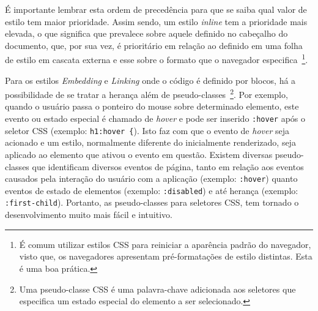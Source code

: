 É importante lembrar esta ordem de precedência para que se saiba qual valor de estilo tem maior prioridade. Assim sendo, um estilo \textit{inline} tem a prioridade mais elevada, o que significa que prevalece sobre aquele definido no cabeçalho do documento, que, por sua vez, é prioritário em relação ao definido em uma folha de estilo em cascata externa e esse sobre o formato que o navegador especifica~\footnote{É comum utilizar estilos CSS para reiniciar a aparência padrão do navegador, visto que, os navegadores apresentam pré-formatações de estilo distintas. Esta é uma boa prática.}.

Para os estilos \textit{Embedding} e \textit{Linking} onde o código é definido por blocos, há a possibilidade de se tratar a herança além de pseudo-classes~\footnote{Uma pseudo-classe CSS é uma palavra-chave adicionada aos seletores que especifica um estado especial do elemento a ser selecionado.}. Por exemplo, quando o usuário passa o ponteiro do mouse sobre determinado elemento, este evento ou estado especial é chamado de \textit{hover} e pode ser inserido \texttt{:hover} após o seletor CSS (exemplo: \texttt{h1:hover \{}). Isto faz com que o evento de \textit{hover} seja acionado e um estilo, normalmente diferente do inicialmente renderizado, seja aplicado ao elemento que ativou o evento em questão. Existem diversas pseudo-classes que identificam diversos eventos de página, tanto em relação aos eventos causados pela interação do usuário com a aplicação (exemplo: \texttt{:hover}) quanto eventos de estado de elementos (exemplo: \texttt{:disabled}) e até herança (exemplo: \texttt{:first-child}). Portanto, as pseudo-classes para seletores CSS, tem tornado o desenvolvimento muito mais fácil e intuitivo.

\begin{figure}[th]
\end{figure}

